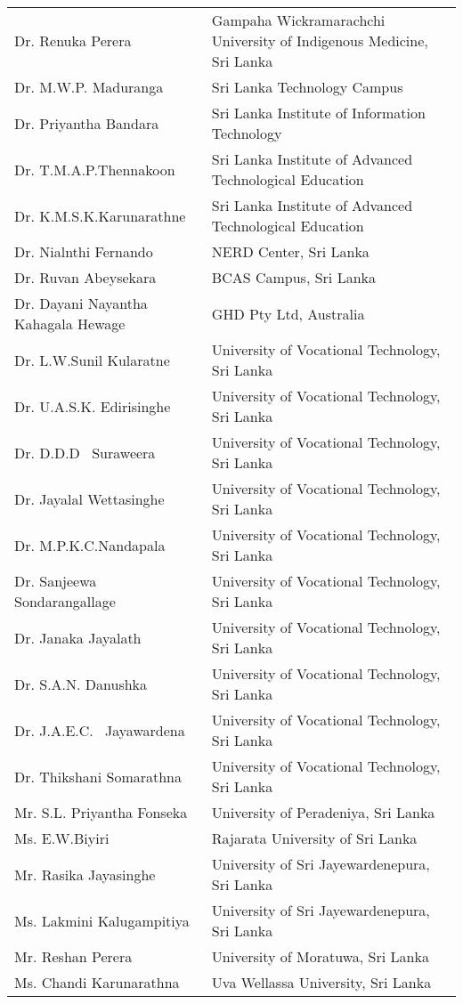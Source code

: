 \begin{longtable}{ L{4.8cm}  L{6.8cm} }
Dr. Renuka Perera &  Gampaha Wickramarachchi University of Indigenous Medicine, Sri Lanka\\
Dr. M.W.P. Maduranga &  Sri Lanka Technology Campus\\
Dr. Priyantha Bandara &  Sri Lanka Institute of Information Technology\\
Dr. T.M.A.P.Thennakoon &  Sri Lanka Institute of Advanced Technological Education\\
Dr. K.M.S.K.Karunarathne &  Sri Lanka Institute of Advanced Technological Education\\
Dr. Nialnthi Fernando &  NERD Center, Sri Lanka\\
Dr. Ruvan Abeysekara &  BCAS Campus, Sri Lanka\\
Dr. Dayani Nayantha Kahagala Hewage &  GHD Pty Ltd, Australia\\
Dr. L.W.Sunil Kularatne &  University of Vocational Technology, Sri Lanka\\
Dr. U.A.S.K. Edirisinghe &  University of Vocational Technology, Sri Lanka\\
Dr. D.D.D  Suraweera &  University of Vocational Technology, Sri Lanka\\
Dr. Jayalal Wettasinghe &  University of Vocational Technology, Sri Lanka\\
Dr. M.P.K.C.Nandapala &  University of Vocational Technology, Sri Lanka\\
Dr. Sanjeewa Sondarangallage &  University of Vocational Technology, Sri Lanka\\
Dr. Janaka Jayalath &  University of Vocational Technology, Sri Lanka\\
Dr. S.A.N. Danushka &  University of Vocational Technology, Sri Lanka\\
Dr. J.A.E.C.  Jayawardena &  University of Vocational Technology, Sri Lanka\\
Dr. Thikshani Somarathna &  University of Vocational Technology, Sri Lanka\\
Mr. S.L. Priyantha Fonseka &  University of Peradeniya, Sri Lanka\\
Ms. E.W.Biyiri &  Rajarata University of Sri Lanka\\
Mr. Rasika Jayasinghe &  University of Sri Jayewardenepura, Sri Lanka\\
Ms. Lakmini Kalugampitiya &  University of Sri Jayewardenepura, Sri Lanka\\
Mr. Reshan Perera &  University of Moratuwa, Sri Lanka\\
Ms. Chandi Karunarathna &  Uva Wellassa University, Sri Lanka\\

\end{longtable}
